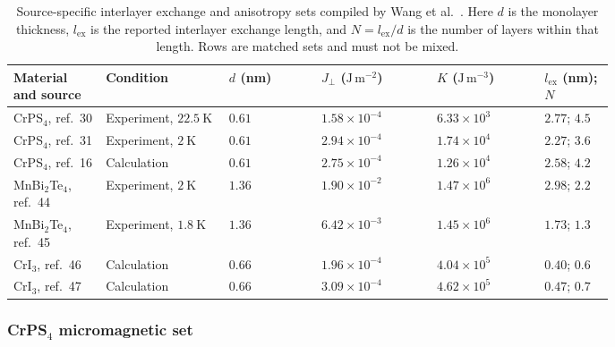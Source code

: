 \begin{table}[htbp]
    \centering
    \small
    \renewcommand{\arraystretch}{1.12}
    \begin{tabular}{p{0.12\linewidth}p{0.16\linewidth}p{0.12\linewidth}p{0.15\linewidth}p{0.14\linewidth}p{0.09\linewidth}}
        \hline
        Material and source
            & Condition
            & $d$ (nm)
            & $J_\perp$ ($\mathrm{J\,m^{-2}}$)
            & $K$ ($\mathrm{J\,m^{-3}}$)
            & $l_{\mathrm{ex}}$ (nm); $N$ \\
        \hline
        CrPS$_4$, ref.~30
            & Experiment, $22.5\ \mathrm{K}$
            & $0.61$ & $1.58\times10^{-4}$ & $6.33\times10^{3}$ & $2.77$; $4.5$ \\
        CrPS$_4$, ref.~31
            & Experiment, $2\ \mathrm{K}$
            & $0.61$ & $2.94\times10^{-4}$ & $1.74\times10^{4}$ & $2.27$; $3.6$ \\
        CrPS$_4$, ref.~16
            & Calculation
            & $0.61$ & $2.75\times10^{-4}$ & $1.26\times10^{4}$ & $2.58$; $4.2$ \\
        MnBi$_2$Te$_4$, ref.~44
            & Experiment, $2\ \mathrm{K}$
            & $1.36$ & $1.90\times10^{-2}$ & $1.47\times10^{6}$ & $2.98$; $2.2$ \\
        MnBi$_2$Te$_4$, ref.~45
            & Experiment, $1.8\ \mathrm{K}$
            & $1.36$ & $6.42\times10^{-3}$ & $1.45\times10^{6}$ & $1.73$; $1.3$ \\
        CrI$_3$, ref.~46
            & Calculation
            & $0.66$ & $1.96\times10^{-4}$ & $4.04\times10^{5}$ & $0.40$; $0.6$ \\
        CrI$_3$, ref.~47
            & Calculation
            & $0.66$ & $3.09\times10^{-4}$ & $4.62\times10^{5}$ & $0.47$; $0.7$ \\
        \hline
    \end{tabular}
    \caption{Source-specific interlayer exchange and anisotropy sets compiled
        by Wang et al.~\cite{wang2026stoner-afm}.  Here $d$ is the monolayer
        thickness, $l_{\mathrm{ex}}$ is the reported interlayer exchange
        length, and $N=l_{\mathrm{ex}}/d$ is the number of layers within that
        length.  Rows are matched sets and must not be mixed.}
    \label{tab:vdw-afm-interlayer-parameters}
\end{table}

\subsubsection{CrPS$_4$ micromagnetic set}

